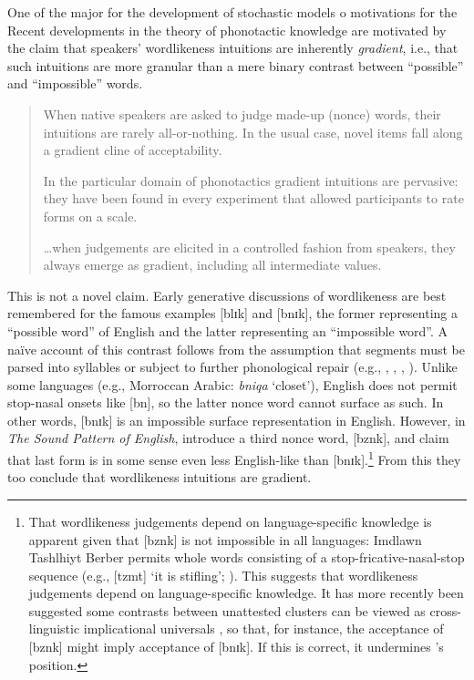 \label{gradience}

One of the major  for the development of stochastic models o
motivations for the 
Recent developments in the theory of phonotactic knowledge are motivated by the claim that speakers' wordlikeness intuitions are inherently \emph{gradient}, i.e., that such intuitions are more granular than a mere binary contrast between ``possible'' and ``impossible'' words.

\begin{quote}
When native speakers are asked to judge made-up (nonce) words, their intuitions are rarely all-or-nothing. 
In the usual case, novel items fall along a gradient cline of acceptability. \citep[][9]{Albright2009a}

In the particular domain of phonotactics gradient intuitions are pervasive: they have been found in every experiment that allowed participants to rate forms on a scale.
\citep[][382]{Hayes2008a}

\ldots{}when judgements are elicited in a controlled fashion from speakers, they always emerge as gradient, including all intermediate values. \citep[371]{Shademan2006} 
\end{quote}

This is not a novel claim. Early generative discussions of wordlikeness \citep[e.g.,][]{Chomsky1965,Halle1962} are best remembered for the famous examples [blɪk] and [bnɪk], the former representing a ``possible word'' of English and the latter representing an ``impossible word''. 
A naïve account of this contrast follows from the assumption that segments must be parsed into syllables or subject to further phonological repair (e.g., \citealt[10f.]{Hooper1973}, \citealt[57f.]{Kahn1976}, \citealt{Ito1989a}, \citealt[19f.]{Wolf2009}). 
Unlike some languages (e.g., Morroccan Arabic: \emph{bniqa} `closet'), English does not permit stop-nasal onsets like [bn], so the latter nonce word cannot surface as such. 
In other words, [bnɪk] is an impossible surface representation in English. 
However, in \emph{The Sound Pattern of English}, \citet{SPE} introduce a third nonce word, [bznk], and claim that last form is in some sense even less English-like than [bnɪk].\footnote{
    That wordlikeness judgements depend on language-specific knowledge is apparent given that [bznk] is not impossible in all languages: Imdlawn Tashlhiyt Berber permits whole words consisting of a stop-fricative-nasal-stop sequence (e.g., [tzmt] `it is stifling'; \citealt[112]{Dell1985}). 
    This suggests that wordlikeness judgements depend on language-specific knowledge.
    It has more recently been suggested some contrasts between unattested clusters can be viewed as cross-linguistic implicational universals \citep[e.g.,][]{Berent2007a,Berent2008a,Berent2009,Berent2007b}, so that, for instance, the acceptance of [bznk] might imply acceptance of [bnɪk]. 
    If this is correct, it undermines \citeauthor{SPE}'s position.}
From this they too conclude that wordlikeness intuitions are gradient.

